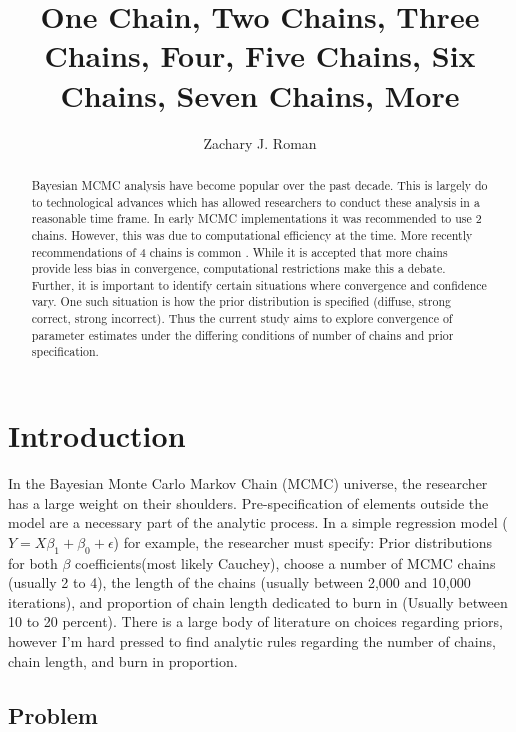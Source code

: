 \documentclass[apa6]{article}
\title{One Chain, Two Chains, Three Chains, Four, Five Chains, Six Chains, Seven Chains, More}
\author{Zachary J. Roman}
\begin{document}
\maketitle

\begin{abstract}
	Bayesian MCMC analysis have become popular over the past decade. This is largely do to technological advances which has allowed researchers to conduct these analysis in a reasonable time frame. In early MCMC implementations it was recommended to use 2 chains. However, this was due to computational efficiency at the time. More recently recommendations of 4 chains is common \cite{plummer2006coda}. While it is accepted that more chains provide less bias in convergence, computational restrictions make this a debate. Further, it is important to identify certain situations where convergence and confidence vary. One such situation is how the prior distribution is specified (diffuse, strong correct, strong incorrect). Thus the current study aims to explore convergence of parameter estimates under the differing conditions of number of chains and prior specification.


\end{abstract}

\section{Introduction}

In the Bayesian Monte Carlo Markov Chain (MCMC) universe, the researcher has a large weight on their shoulders. Pre-specification of elements outside the model are a necessary part of the analytic process. In a simple regression model ($Y = X\beta_{1} + \beta_{0} + \epsilon$) for example, the researcher must specify: Prior distributions for both $\beta$ coefficients(most likely Cauchey), choose a number of MCMC chains (usually 2 to 4), the length of the chains (usually between 2,000 and 10,000 iterations), and proportion of chain length dedicated to burn in (Usually between 10 to 20 percent). There is a large body of literature on choices regarding priors, however I'm hard pressed to find analytic rules regarding the number of chains, chain length, and burn in proportion. 

\subsection{Problem}
\end{document}
